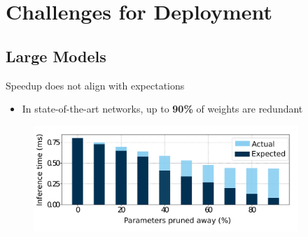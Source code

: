 \documentclass[xcolor=dvipsnames]{beamer}
\begin{document}





\section{Challenges for Deployment}

\subsection{Large Models}


\begin{frame}{Speedup does not align with expectations}

\begin{itemize}
	\item In state-of-the-art networks, up to \textbf{90\%} of weights are redundant
\end{itemize}

\begin{figure}
    \centering
    \includegraphics[width=10cm]{images/speedup.pdf}
\end{figure}



\end{frame}
\end{document}
